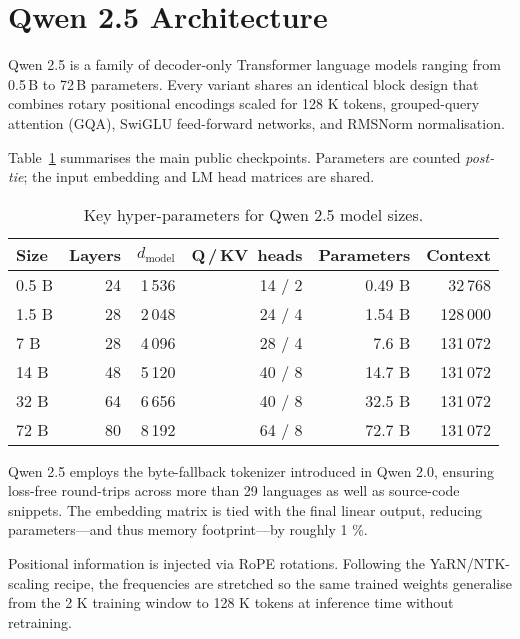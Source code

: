 \section{Qwen 2.5 Architecture}\cite{huggingface}
Qwen 2.5 is a family of decoder-only Transformer language models ranging from
0.5\,B to 72\,B parameters.  Every variant shares an identical block design that
combines rotary positional encodings scaled for 128 K tokens, grouped-query
attention (GQA), SwiGLU feed-forward networks, and RMSNorm
normalisation.

Table~\ref{tab:qwen25-sizes} summarises the main public checkpoints.  Parameters
are counted \emph{post-tie}; the input embedding and LM head matrices are
shared.%

\begin{table}[htbp]
\centering
\caption{Key hyper-parameters for Qwen 2.5 model sizes.}
\label{tab:qwen25-sizes}
\begin{tabular}{@{}lrrrrr@{}}
\toprule
Size & Layers & $d_{\text{model}}$ & Q\,/\,KV~heads & Parameters & Context \\
\midrule
0.5 B  & 24 & 1\,536 & 14 / 2 & 0.49 B & 32\,768 \\
1.5 B  & 28 & 2\,048 & 24 / 4 & 1.54 B & 128\,000 \\
7 B    & 28 & 4\,096 & 28 / 4 & 7.6 B  & 131\,072 \\
14 B   & 48 & 5\,120 & 40 / 8 & 14.7 B & 131\,072 \\
32 B   & 64 & 6\,656 & 40 / 8 & 32.5 B & 131\,072 \\
72 B   & 80 & 8\,192 & 64 / 8 & 72.7 B & 131\,072 \\
\bottomrule
\end{tabular}
\end{table}%

Qwen 2.5 employs the byte-fallback tokenizer introduced in Qwen 2.0, ensuring
loss-free round-trips across more than 29 languages as well as source-code
snippets.  The embedding matrix is tied with the final linear output, reducing
parameters—and thus memory footprint—by roughly 1 \%.%

Positional information is injected via RoPE rotations.  Following the
YaRN/NTK-scaling recipe, the frequencies are stretched so the same trained
weights generalise from the 2 K training window to 128 K tokens at inference
time without retraining.%

